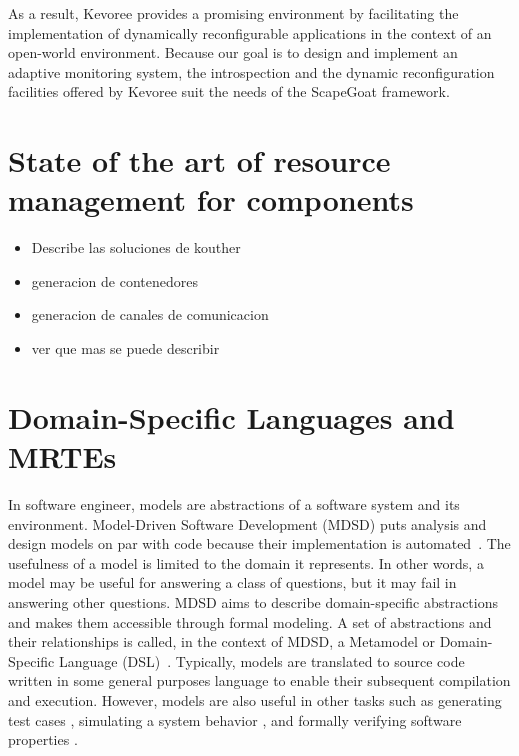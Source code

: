 As a result, Kevoree provides a promising environment by facilitating the implementation of dynamically reconfigurable applications in the context of an open-world environment.
Because our goal is to design and implement an adaptive monitoring system, the introspection and the dynamic reconfiguration facilities offered by Kevoree suit the needs of the ScapeGoat framework.


\section{State of the art of resource management for components} \label{sec:component-leverage}
\begin{itemize}
\item Describe las soluciones de kouther
\item generacion de contenedores
\item generacion de canales de comunicacion
\item ver que mas se puede describir
\end{itemize}

\section{Domain-Specific Languages and MRTEs} \label{sec:DSL-on-MRTEs}

In software engineer, models are abstractions of a software system and its environment.
Model-Driven Software Development (MDSD) puts analysis and design models on par with
code because their implementation is automated~\cite{Stahl:2006:MSD:1196766, Fowler:2010:DSL:1809745}.
The usefulness of a model is limited to the domain it represents.
In other words, a model may be useful for answering a class of questions, but it may fail in answering other questions.
MDSD aims to describe domain-specific abstractions and makes them accessible through formal modeling.
A set of abstractions and their relationships is called, in the context of MDSD, a Metamodel or Domain-Specific Language (DSL)~\cite{Fowler:2010:DSL:1809745}.
Typically, models are translated to source code written in some general purposes language to enable their subsequent compilation and execution.
However, models are also useful in other tasks such as generating test cases \cite{Kiffe2009,Gutierrez2015}, simulating a system behavior \cite{Broenink2012,brosig2015a,Bocciarelli2015425}, and formally verifying software properties \cite{Holzmann2004,Henriksson2005101,Moffett2013,DiGuglielmo20132013}. 

